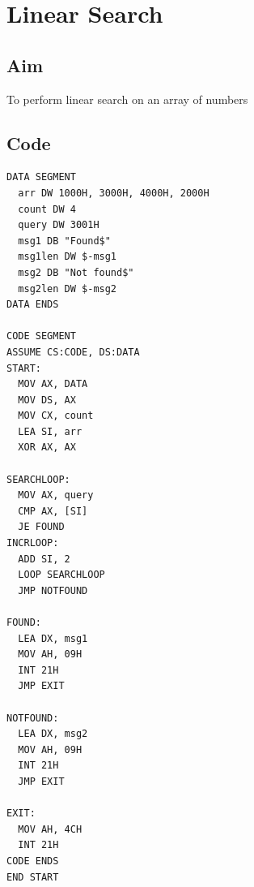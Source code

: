 \section{Linear Search}
\subsection{Aim}
To perform linear search on an array of numbers

\subsection{Code}
\begin{lstlisting}
DATA SEGMENT
  arr DW 1000H, 3000H, 4000H, 2000H
  count DW 4
  query DW 3001H
  msg1 DB "Found$"
  msg1len DW $-msg1
  msg2 DB "Not found$"
  msg2len DW $-msg2
DATA ENDS

CODE SEGMENT
ASSUME CS:CODE, DS:DATA
START:
  MOV AX, DATA
  MOV DS, AX
  MOV CX, count
  LEA SI, arr
  XOR AX, AX

SEARCHLOOP:
  MOV AX, query
  CMP AX, [SI]
  JE FOUND
INCRLOOP:
  ADD SI, 2
  LOOP SEARCHLOOP
  JMP NOTFOUND

FOUND:
  LEA DX, msg1
  MOV AH, 09H
  INT 21H
  JMP EXIT

NOTFOUND:
  LEA DX, msg2
  MOV AH, 09H
  INT 21H
  JMP EXIT  

EXIT:
  MOV AH, 4CH
  INT 21H
CODE ENDS
END START
\end{lstlisting}

